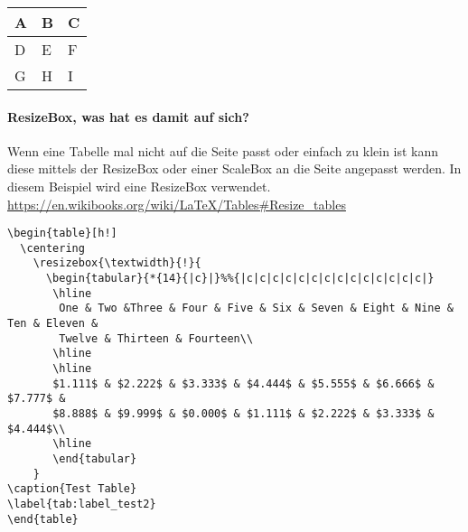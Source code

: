 \begin{tabular}{ | l | l | l | }
	\hline
	A & B & C \\
	\hline
	D & E & \cellcolor{green}F \\
	\hline
	G & H & I \\
	\hline
\end{tabular}
\paragraph{ResizeBox, was hat es damit auf sich?}
Wenn eine Tabelle mal nicht auf die Seite passt oder einfach zu klein ist kann diese mittels der ResizeBox oder einer ScaleBox an die Seite angepasst werden. In diesem Beispiel wird eine ResizeBox verwendet. \url{https://en.wikibooks.org/wiki/LaTeX/Tables#Resize_tables}

\begin{lstlisting}[style=LaTeX]
\begin{table}[h!]
  \centering
    \resizebox{\textwidth}{!}{
      \begin{tabular}{*{14}{|c}|}%%{|c|c|c|c|c|c|c|c|c|c|c|c|c|c|}
       \hline
        One & Two &Three & Four & Five & Six & Seven & Eight & Nine & Ten & Eleven &
        Twelve & Thirteen & Fourteen\\
       \hline
       \hline
       $1.111$ & $2.222$ & $3.333$ & $4.444$ & $5.555$ & $6.666$ & $7.777$ &
       $8.888$ & $9.999$ & $0.000$ & $1.111$ & $2.222$ & $3.333$ & $4.444$\\
       \hline
       \end{tabular}
    }
\caption{Test Table}
\label{tab:label_test2}
\end{table}
\end{lstlisting}

	\begin{table}[h!]
		\centering
		\caption{Test Table}
		\label{tab:label_test}
	\end{table}
